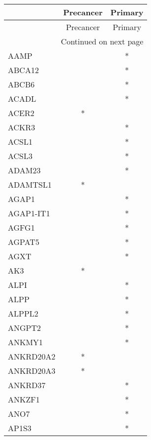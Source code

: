 \begin{longtable}{lcc}
\toprule
{} & Precancer & Primary \\
\midrule
\endfirsthead

\toprule
{} & Precancer & Primary \\
\midrule
\endhead
\midrule
\multicolumn{3}{r}{{Continued on next page}} \\
\midrule
\endfoot

\bottomrule
\endlastfoot
AAMP           &           &       * \\
ABCA12         &           &       * \\
ABCB6          &           &       * \\
ACADL          &           &       * \\
ACER2          &         * &         \\
ACKR3          &           &       * \\
ACSL1          &           &       * \\
ACSL3          &           &       * \\
ADAM23         &           &       * \\
ADAMTSL1       &         * &         \\
AGAP1          &           &       * \\
AGAP1-IT1      &           &       * \\
AGFG1          &           &       * \\
AGPAT5         &           &       * \\
AGXT           &           &       * \\
AK3            &         * &         \\
ALPI           &           &       * \\
ALPP           &           &       * \\
ALPPL2         &           &       * \\
ANGPT2         &           &       * \\
ANKMY1         &           &       * \\
ANKRD20A2      &         * &         \\
ANKRD20A3      &         * &         \\
ANKRD37        &           &       * \\
ANKZF1         &           &       * \\
ANO7           &           &       * \\
AP1S3          &           &       * \\

\end{longtable}
